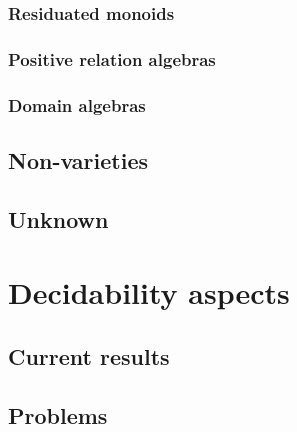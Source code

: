 \documentclass[a4paper]{article}
\theoremstyle{defin}
\theoremstyle{theorem}
\theoremstyle{claim}
\theoremstyle{prop}
\theoremstyle{lemma}
\theoremstyle{fact}
\theoremstyle{ex}
\theoremstyle{col}
\begin{document}
\subsubsection{Residuated monoids}

\subsubsection{Positive relation algebras}

\subsubsection{Domain algebras}


\subsection{Non-varieties}
\subsection{Unknown}

\section{Decidability aspects}
\subsection{Current results}
\subsection{Problems}



\end{document}

